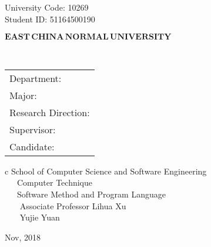 \newpage

\pagestyle{empty}

\hskip 1.83cm {\large University Code: 10269}\\
\hspace*{\fill} {\large Student ID: 51164500190 }

\vskip 2cm

\begin{center}
{\Huge $\mathbf{EAST}\,\mathbf{CHINA}\,\mathbf{NORMAL}\,
\mathbf{UNIVERSITY}$}
\end{center}

\vskip 3cm

\begin{center}
\bfseries{\scshape{\huge \TheisNameEn
}}\\
\end{center}

\vskip 2cm {\large
\begin{center}
\begin{tabular}{l}
Department:\\
Major:\\ 
Research Direction:\\
Supervisor:\\
Candidate:
\end{tabular}
\begin{tabular}c
\normalsize{School of Computer Science and Software Engineering}\\
\hline ~~~Computer Technique    \\
\hline ~~~Software Method and Program Language\\
\hline ~~~ Associate Professor Lihua Xu\\
\hline ~~~  Yujie  Yuan\\
\hline
\end{tabular}
\end{center}}

\vskip 30mm

\begin{center}
{\Large Nov, 2018}
\end{center}
